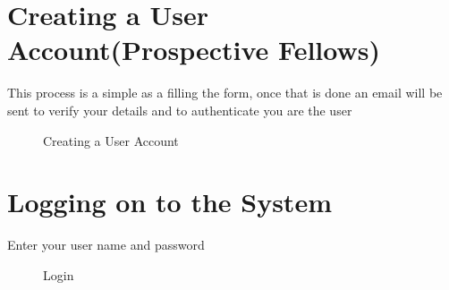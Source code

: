 \documentclass[12pt]{article}
\begin{document}
 \newpage
\section{Creating a User Account(Prospective Fellows)}
This process is a simple as a filling the form, once that is done an email will be sent to verify your details and to authenticate you are the user
\begin{figure}[H]
\centering	
{}
\caption{Creating a User Account}
\end{figure}
 \newpage
 
\section{Logging on to the System}

Enter your user name and password
\begin{figure}[H]
\centering	
{}
\caption{Login}
\end{figure}
\end{document}
